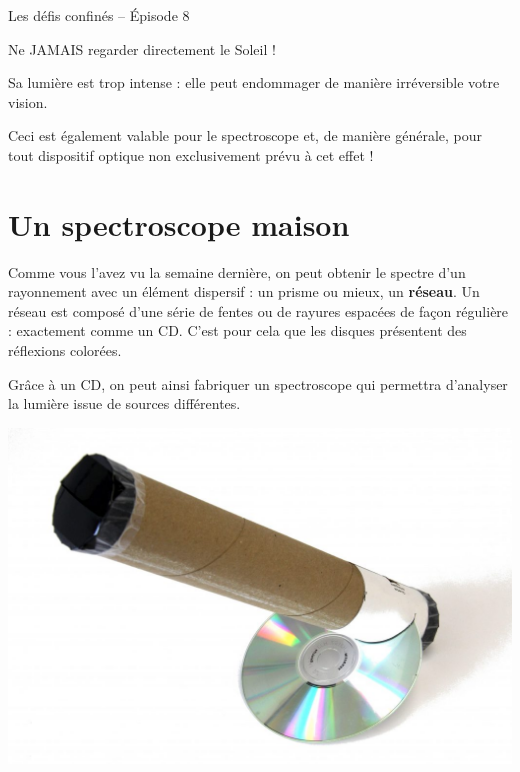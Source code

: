 \documentclass[12pt,a4paper]{article}
\begin{document}
\begin{header}
	Les défis confinés -- Épisode 8
\end{header}

\begin{center}
	\color{red}
	\begin{bfseries}
		\warning{} \warning{} \warning{}
		Ne JAMAIS regarder directement le Soleil !
		\warning{} \warning{} \warning{}
	\end{bfseries}
		
	Sa lumière est trop intense : elle peut endommager de manière irréversible votre vision.
	
	Ceci est également valable pour le spectroscope et, de manière générale, pour tout dispositif optique non exclusivement prévu à cet effet !
\end{center}

\section*{Un spectroscope maison}

\begin{multicols}{2}
	Comme vous l'avez vu la semaine dernière, on peut obtenir le spectre d'un rayonnement avec un élément dispersif : un prisme ou mieux, un \textbf{réseau}.
	Un réseau est composé d'une série de fentes ou de rayures espacées de façon régulière : exactement comme un CD.
	C'est pour cela que les disques présentent des réflexions colorées.
	
	Grâce à un CD, on peut ainsi fabriquer un spectroscope qui permettra d'analyser la lumière issue de sources différentes.
	\vfill

	\begin{center}
		\includegraphics[width=\linewidth]{images/spectro.jpg}
	\end{center}
\end{multicols}
\end{document}
